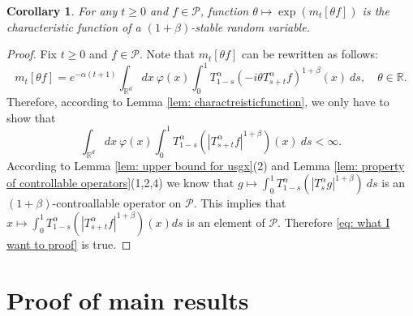 \documentclass[12pt,oneside,english]{amsart}
\theoremstyle{plain}
\newtheorem{cor}[thm]{Corollary}
\theoremstyle{definition}
\numberwithin{equation}{section}
\begin{document}
\begin{cor}
\label{cor: alpha stable rv}
	For any $t\geq 0$ and $f\in \mathcal P$, function $\theta \mapsto \exp(m_t[\theta f])$ is the characteristic function of a $(1+\beta)$-stable random variable.
\end{cor}
\begin{proof}
	Fix $t\geq 0$ and $f\in \mathcal P$.
	Note that $m_t[\theta f]$ can be rewritten as follows:
\[
    m_t[\theta f]= e^{-\alpha (t+1)}\int_{\mathbb R^d} dx~\varphi(x)\int_0^1 T_{1-s}^\alpha (-i\theta T_{s+t}^\alpha f)^{1+\beta}(x)~ds,
    \quad \theta \in \mathbb R.
\]
	Therefore, according to Lemma \ref{lem: charactreisticfunction}, we only have to show that
\begin{equation}
\label{eq: what I want to proof}
	\int_{\mathbb R^d} dx~\varphi(x)\int_0^1 T_{1-s}^\alpha (|T_{s+t}^\alpha f|^{1+\beta})(x)~ds < \infty.
\end{equation}
	According to Lemma \ref{lem: upper bound for usgx}(2) and Lemma \ref{lem: property of controllable operators}(1,2,4) we know that
$
	g \mapsto \int_0^1 T_{1-s}^\alpha (|T_{s}^\alpha g|^{1+\beta})~ds
$
	is an $(1+\beta)$-controallable operator on $\mathcal P$.
	This implies that $x \mapsto \int_0^1 T_{1-s}^\alpha (|T_{s+t}^\alpha f|^{1+\beta})(x) ds$ is an element of $\mathcal P$.
	Therefore \eqref{eq: what I want to proof} is true.
\end{proof}


\section{Proof of main results}
\end{document}
